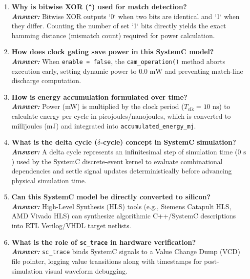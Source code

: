 \documentclass[11pt,a4paper,oneside]{report}
\begin{document}
\begin{enumerate}[leftmargin=*, label=\bfseries Q\arabic*:]
    \item \textbf{Why is bitwise XOR (\texttt{\^{}}) used for match detection?}\\
    \textit{\textbf{Answer:}} Bitwise XOR outputs `0` when two bits are identical and `1` when they differ. Counting the number of set `1` bits directly yields the exact hamming distance (mismatch count) required for power calculation.

    \item \textbf{How does clock gating save power in this SystemC model?}\\
    \textit{\textbf{Answer:}} When \texttt{enable = false}, the \texttt{cam\_operation()} method aborts execution early, setting dynamic power to $0.0\text{ mW}$ and preventing match-line discharge computation.

    \item \textbf{How is energy accumulation formulated over time?}\\
    \textit{\textbf{Answer:}} Power (mW) is multiplied by the clock period ($T_{\text{clk}} = 10\text{ ns}$) to calculate energy per cycle in picojoules/nanojoules, which is converted to millijoules (mJ) and integrated into \texttt{accumulated\_energy\_mj}.

    \item \textbf{What is the delta cycle ($\delta$-cycle) concept in SystemC simulation?}\\
    \textit{\textbf{Answer:}} A delta cycle represents an infinitesimal step of simulation time ($0\text{ s}$) used by the SystemC discrete-event kernel to evaluate combinational dependencies and settle signal updates deterministically before advancing physical simulation time.

    \item \textbf{Can this SystemC model be directly converted to silicon?}\\
    \textit{\textbf{Answer:}} High-Level Synthesis (HLS) tools (e.g., Siemens Catapult HLS, AMD Vivado HLS) can synthesize algorithmic C++/SystemC descriptions into RTL Verilog/VHDL target netlists.

    \item \textbf{What is the role of \texttt{sc\_trace} in hardware verification?}\\
    \textit{\textbf{Answer:}} \texttt{sc\_trace} binds SystemC signals to a Value Change Dump (VCD) file pointer, logging value transitions along with timestamps for post-simulation visual waveform debugging.


\end{enumerate}
\end{document}
